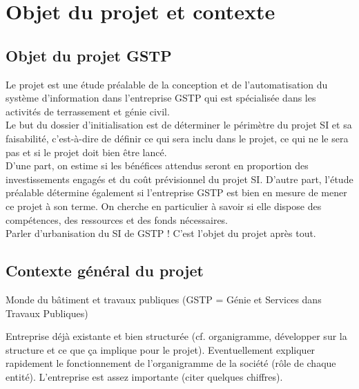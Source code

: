 \section{Objet du projet et contexte}

\subsection{Objet du projet GSTP}
Le projet est une étude préalable de la conception et de l'automatisation
du système d'information dans l'entreprise GSTP qui est spécialisée dans
les activités de terrassement et génie civil.\\

Le but du dossier d'initialisation est de déterminer le périmètre du projet
SI et sa faisabilité, c’est-à-dire de définir ce qui sera inclu
dans le projet, ce qui ne le sera pas et si le projet doit bien être
lancé.\\

D’une part, on estime si les bénéfices attendus seront en proportion des
investissements engagés et du coût prévisionnel du projet SI.  D’autre
part, l’étude préalable détermine également si l’entreprise GSTP est
bien en mesure de mener ce projet à son terme. On cherche en particulier
à savoir si elle dispose des compétences, des ressources et des fonds
nécessaires.\\

Parler d'urbanisation du SI de GSTP ! C'est l'objet du projet après tout.


\subsection{Contexte général du projet}

Monde du bâtiment et travaux publiques (GSTP = Génie et Services dans
Travaux Publiques)

Entreprise déjà existante et bien structurée (cf. organigramme, développer
sur la structure et ce que ça implique pour le projet). Eventuellement
expliquer rapidement le fonctionnement de l'organigramme de la société
(rôle de chaque entité). L'entreprise est assez importante (citer quelques
chiffres).

